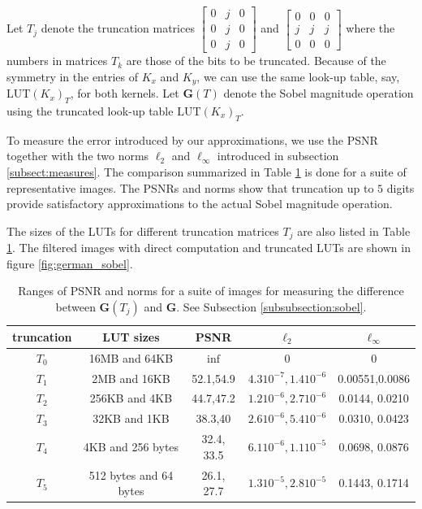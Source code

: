 \documentclass[12pt]{amsart}
\theoremstyle{definition}
\theoremstyle{remark}
\numberwithin{thm}{section}
\newcommand{\LUT}{\text{LUT}}
\begin{document}
Let $T_j$ denote the truncation matrices
$\begin{bmatrix}
0 & j & 0\\
0 & j & 0\\
0 & j & 0
\end{bmatrix}
$ and 
$\begin{bmatrix}
0 & 0 & 0\\
j & j & j\\
0 & 0 & 0
\end{bmatrix}
$
where the numbers in matrices $T_k$ are those of the bits to be truncated. Because of the symmetry in the entries of $K_x$ and $K_y$, we can use the same look-up table, say, $\LUT(K_x)_T$, for both kernels. Let $\mathbf{G}(T)$ denote the Sobel magnitude operation using the truncated look-up table $\LUT(K_x)_T$.

To measure the error introduced by our approximations, we use the PSNR together with the two norms $\ell_2$ and $\ell_{\infty}$ introduced in subsection \ref{subsect:measures}. The comparison summarized in Table \ref{tbl:sobel} is done for a suite of representative images. The PSNRs and norms show that truncation up to $5$ digits provide satisfactory approximations to the actual Sobel magnitude operation.

The sizes of the LUTs for different truncation matrices $T_j$ are also listed in Table \ref{tbl:sobel}. The filtered images with direct computation and truncated LUTs are shown in figure \ref{fig:german_sobel}.
\begin{center}
\begin{table}[h]
    \begin{tabular}{ | c | c | c | c | c | }
    \hline
    \hline
truncation &	LUT sizes	&PSNR 	&$\ell_2$ 	&$\ell_{\infty}$ \\ \hline
$T_0$&	16MB and 64KB		&$\inf$		&0	&0\\ \hline
$T_1$&	2MB and 16KB		&52.1,54.9	&$4.3 10^{-7}, 1.4 10^{-6}$	&0.00551,0.0086\\ \hline
$T_2$&	256KB and 4KB		&44.7,47.2	&$1.2 10^{-6}, 2.7 10^{-6}$	&0.0144, 0.0210\\ \hline
$T_3$&	32KB and 1KB		&38.3,40	&$2.6 10^{-6}, 5.4 10^{-6}$	&0.0310, 0.0423\\ \hline
$T_4$&	4KB	and 256 bytes	&32.4, 33.5	&$6.1 10^{-6}, 1.1 10^{-5}$	&0.0698, 0.0876\\ \hline
$T_5$&	512 bytes and 64 bytes &26.1, 27.7	&$1.3 10^{-5}, 2.8 10^{-5}$		&0.1443, 0.1714\\ \hline
 \end{tabular}
\caption{Ranges of PSNR and norms for a suite of images for measuring the difference between $\mathbf{G}(T_j)$ and $\mathbf{G}$. See Subsection \ref{subsubsection:sobel}.}\label{tbl:sobel}
\end{table} 
\end{center}
\end{document}
